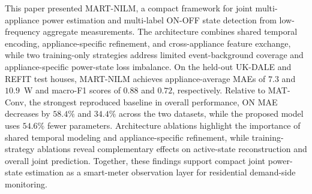 \documentclass[journal]{IEEEtran}
\begin{document}
This paper presented MART-NILM, a compact framework for joint multi-appliance power estimation and multi-label ON-OFF state detection from low-frequency aggregate measurements. The architecture combines shared temporal encoding, appliance-specific refinement, and cross-appliance feature exchange, while two training-only strategies address limited event-background coverage and appliance-specific power-state loss imbalance. On the held-out UK-DALE and REFIT test houses, MART-NILM achieves appliance-average MAEs of $7.3$ and $10.9$~W and macro-F1 scores of $0.88$ and $0.72$, respectively. Relative to MAT-Conv, the strongest reproduced baseline in overall performance, ON MAE decreases by $58.4\%$ and $34.4\%$ across the two datasets, while the proposed model uses $54.6\%$ fewer parameters. Architecture ablations highlight the importance of shared temporal modeling and appliance-specific refinement, while training-strategy ablations reveal complementary effects on active-state reconstruction and overall joint prediction. Together, these findings support compact joint power-state estimation as a smart-meter observation layer for residential demand-side monitoring.



\end{document}
